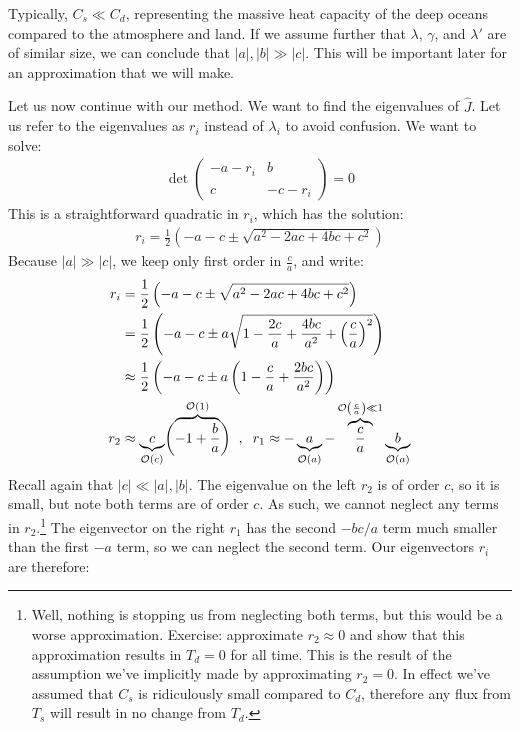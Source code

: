 Typically, $C_s\ll C_d$, representing the massive heat capacity of the deep oceans compared to the atmosphere and land. If we assume further that $\lambda$, $\gamma$, and $\lambda'$ are of similar size, we can conclude that $|a|,|b|\gg |c|$. This will be important later for an approximation that we will make. 

Let us now continue with our method. We want to find the eigenvalues of $\hat{J}$. Let us refer to the eigenvalues as $r_i$ instead of $\lambda_i$ to avoid confusion. We want to solve:
\begin{align*}
    \det\left( \begin{array}{cc}
        -a-r_i & b \\\\
        c & -c-r_i
    \end{array}
    \right)=0
\end{align*}
This is a straightforward quadratic in $r_i$, which has the solution:
\begin{align*}
    r_i=\frac{1}{2}\left( -a-c \pm \sqrt{a^2-2ac+4bc+c^2} \right)
\end{align*}
Because $|a|\gg |c|$, we keep only first order in $\frac{c}{a}$, and write:
\begin{align*}
    r_i&=\frac{1}{2}\left( -a-c \pm \sqrt{a^2-2ac+4bc+c^2} \right)\\
    &= \frac{1}{2}\left( 
        -a-c \pm a\sqrt{1-\frac{2c}{a}+\frac{4bc}{a^2}+\left( \frac{c}{a} \right)^2}
     \right) \\ 
    &\approx \frac{1}{2}\left( 
        -a-c \pm a\left(1-\frac{c}{a}+\frac{2bc}{a^2}\right)
     \right) 
    \\ 
    r_2&\approx \underbrace{c}_{\mathcal{O}(c)} \biggl( \overbrace{-1+\frac{b}{a}}^{\mathcal{O}(1)} \biggr)
    \hspace{2mm},\hspace{2mm}
    r_1\approx -\underbrace{a}_{\mathcal{O}(a)}-\overbrace{\frac{c}{a}}^{\mathcal{O}\left( \frac{c}{a} \right)\ll 1}\underbrace{b}_{\mathcal{O}(a)}
\end{align*}
Recall again that $|c|\ll |a|,|b|$. The eigenvalue on the left $r_2$ is of order $c$, so it is small, but note both terms are of order $c$. As such, we cannot neglect any terms in $r_2$.\footnote{Well, nothing is stopping us from neglecting both terms, but this would be a worse approximation. Exercise: approximate $r_2\approx 0$ and show that this approximation results in $T_d=0$ for all time. This is the result of the assumption we've implicitly made by approximating $r_2=0$. In effect we've assumed that $C_s$ is ridiculously small compared to $C_d$, therefore any flux from $T_s$ will result in no change from $T_d$.} The eigenvector on the right $r_1$ has the second $-bc/a$ term much smaller than the first $-a$ term, so we can neglect the second term. Our eigenvectors $r_i$ are therefore:
